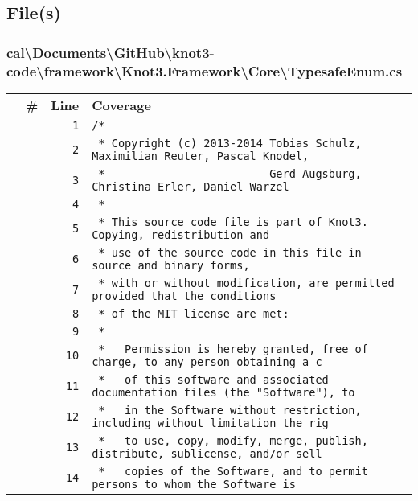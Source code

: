 \documentclass[a4paper,10pt]{article}
\begin{document}
\subsection{File(s)}
\subsubsection{cal\textbackslash Documents\textbackslash GitHub\textbackslash knot3-code\textbackslash framework\textbackslash Knot3.Framework\textbackslash Core\textbackslash TypesafeEnum.cs}
\begin{longtable}[l]{lrrl}
\textbf{} & \textbf{\#} & \textbf{Line} & \textbf{Coverage}\\
\cellcolor{gray} &  & \verb~1~ & \verb~/*~\\
\cellcolor{gray} &  & \verb~2~ & \verb~ * Copyright (c) 2013-2014 Tobias Schulz, Maximilian Reuter, Pascal Knodel,~\\
\cellcolor{gray} &  & \verb~3~ & \verb~ *                         Gerd Augsburg, Christina Erler, Daniel Warzel~\\
\cellcolor{gray} &  & \verb~4~ & \verb~ *~\\
\cellcolor{gray} &  & \verb~5~ & \verb~ * This source code file is part of Knot3. Copying, redistribution and~\\
\cellcolor{gray} &  & \verb~6~ & \verb~ * use of the source code in this file in source and binary forms,~\\
\cellcolor{gray} &  & \verb~7~ & \verb~ * with or without modification, are permitted provided that the conditions~\\
\cellcolor{gray} &  & \verb~8~ & \verb~ * of the MIT license are met:~\\
\cellcolor{gray} &  & \verb~9~ & \verb~ *~\\
\cellcolor{gray} &  & \verb~10~ & \verb~ *   Permission is hereby granted, free of charge, to any person obtaining a c~\\
\cellcolor{gray} &  & \verb~11~ & \verb~ *   of this software and associated documentation files (the "Software"), to ~\\
\cellcolor{gray} &  & \verb~12~ & \verb~ *   in the Software without restriction, including without limitation the rig~\\
\cellcolor{gray} &  & \verb~13~ & \verb~ *   to use, copy, modify, merge, publish, distribute, sublicense, and/or sell~\\
\cellcolor{gray} &  & \verb~14~ & \verb~ *   copies of the Software, and to permit persons to whom the Software is~\\

\end{longtable}
\end{document}
